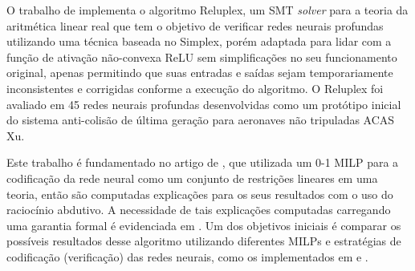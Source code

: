 O trabalho de  implementa o algoritmo Reluplex, um SMT \textit{solver} para a teoria da aritmética linear real que tem o objetivo de verificar redes neurais profundas utilizando uma técnica baseada no Simplex, porém adaptada para lidar com a função de ativação não-convexa ReLU sem simplificações no seu funcionamento original, apenas permitindo que suas entradas e saídas sejam temporariamente inconsistentes e corrigidas conforme a execução do algoritmo. O Reluplex foi avaliado em 45 redes neurais profundas desenvolvidas como um protótipo inicial do sistema anti-colisão de última geração para aeronaves não tripuladas ACAS Xu. 

Este trabalho é fundamentado no artigo de , que utilizada um 0-1 MILP \cite{milp_01} para a codificação da rede neural como um conjunto de restrições lineares em uma teoria, então são computadas explicações para os seus resultados com o uso do raciocínio abdutivo. A necessidade de tais explicações computadas carregando uma garantia formal é evidenciada em . Um dos objetivos iniciais é comparar os possíveis resultados desse algoritmo utilizando diferentes MILPs e estratégias de codificação (verificação) das redes neurais, como os implementados em  e .